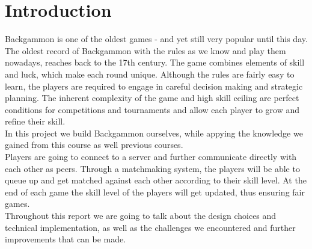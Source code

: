 \documentclass[ twoside,openright,titlepage,numbers=noenddot,headinclude,%
                footinclude=true,cleardoublepage=empty,abstractoff, %
                BCOR=5mm,paper=a4,fontsize=11pt,%
                ngerman,american,%
                ]{scrreprt}
\begin{document}
\frenchspacing
\raggedbottom
{} %
\pagestyle{plain}



\pagestyle{scrheadings}
\cleardoublepage
\cleardoublepage{}
\cleardoublepage


\chapter{Introduction}
\label{cha:introduction}
Backgammon is one of the oldest games - and yet still very popular until this day. The oldest record of Backgammon with the rules as we know and play them nowadays, reaches back to the 17th century. 
The game combines elements of skill and luck, which make each round unique. Although the rules are fairly easy to learn, the players are required to engage in careful decision making and strategic planning.
The inherent complexity of the game and high skill ceiling are perfect conditions for competitions and tournaments and allow each player to grow and refine their skill. \\
In this project we build Backgammon ourselves, while appying the knowledge we gained from this course as well previous courses. \\
Players are going to connect to a server and further communicate directly with each other as peers. %
Through a matchmaking system, the players will be able to queue up and get matched against each other according to their skill level. 
At the end of each game the skill level of the players will get updated, thus ensuring fair games.\\
Throughout this report we are going to talk about the design choices and technical implementation, as well as the challenges we encountered and further improvements that can be made. 
\end{document}
